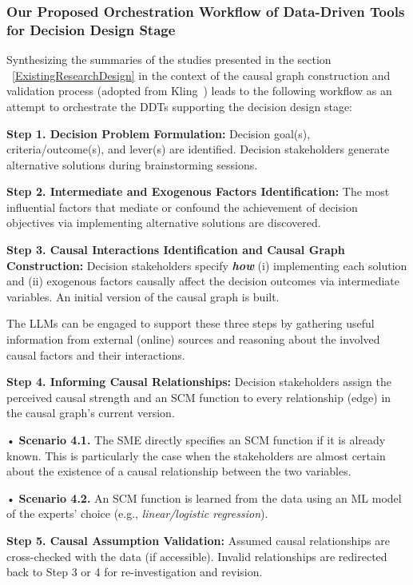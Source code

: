 \documentclass{sfuthesis}
\begin{document}
\subsubsection{Our Proposed Orchestration Workflow of Data-Driven Tools for Decision Design Stage}
Synthesizing the summaries of the studies presented in the section ~\ref{ExistingResearchDesign} in the context of the causal graph construction and validation process (adopted from Kling~\cite{kling2025co}) leads to the following workflow as an attempt to orchestrate the DDTs supporting the decision design stage:\par
\textbf{Step 1. Decision Problem Formulation:} Decision goal(s), criteria/outcome(s), and lever(s) are identified. Decision stakeholders generate alternative solutions during brainstorming sessions. \par
\textbf{Step 2. Intermediate and Exogenous Factors Identification:} The most influential factors that mediate or confound the achievement of decision objectives via implementing alternative solutions are discovered.\par
\textbf{Step 3. Causal Interactions Identification and Causal Graph Construction:} Decision stakeholders specify \textbf{\textit{how}} (i) implementing each solution and (ii) exogenous factors causally affect the decision outcomes via intermediate variables. An initial version of the causal graph is built.\par
The LLMs can be engaged to support these three steps by gathering useful information from external (online) sources and reasoning about the involved causal factors and their interactions.\par
\textbf{Step 4. Informing Causal Relationships:} Decision stakeholders assign the perceived causal strength and an SCM function to every relationship (edge) in the causal graph's current version.\par
{
\setlength{\leftskip}{0.5cm}
\noindent• \textbf{Scenario 4.1.} The SME directly specifies an SCM function if it is already known. This is particularly the case when the stakeholders are almost certain about the existence of a causal relationship between the two variables.\par
\noindent• \textbf{Scenario 4.2.} An SCM function is learned from the data using an ML model of the experts' choice (e.g., \textit{linear/logistic regression}).\par
}
\textbf{Step 5. Causal Assumption Validation:} Assumed causal relationships are cross-checked with the data (if accessible). Invalid relationships are redirected back to Step 3 or 4 for re-investigation and revision.\par
\end{document}
